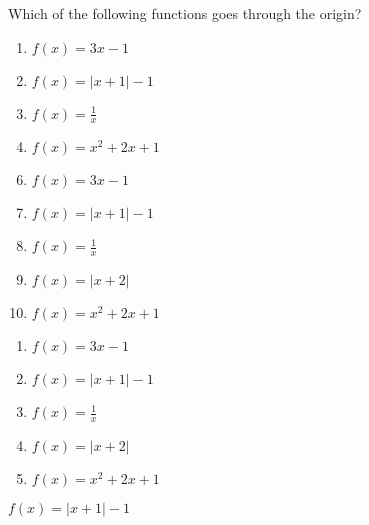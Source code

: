 

 Which of the following functions goes through the origin?



\ifsat
	\begin{enumerate}[label=\Alph*)]
		\item  $f(x)=3x-1$
		\item  $f(x)=|x+1|-1$%
		\item  $f(x)=\frac{1}{x}$
		\item  $f(x)=x^{2}+2x+1$
	\end{enumerate}
\else
\fi

\ifacteven
	\begin{enumerate}[label=\textbf{\Alph*.},itemsep=\fill,align=left]
		\setcounter{enumii}{5}
		\item  $f(x)=3x-1$
		\item  $f(x)=|x+1|-1$%
		\item  $f(x)=\frac{1}{x}$
		\addtocounter{enumii}{1}
		\item  $f(x)=|x+2|$
		\item  $f(x)=x^{2}+2x+1$
	\end{enumerate}
\else
\fi

\ifactodd
	\begin{enumerate}[label=\textbf{\Alph*.},itemsep=\fill,align=left]
		\item  $f(x)=3x-1$
		\item  $f(x)=|x+1|-1$%
		\item  $f(x)=\frac{1}{x}$
		\item  $f(x)=|x+2|$
		\item  $f(x)=x^{2}+2x+1$
	\end{enumerate}
\else
\fi

\ifgridin
  $f(x)=|x+1|-1$%
		
\else
\fi

